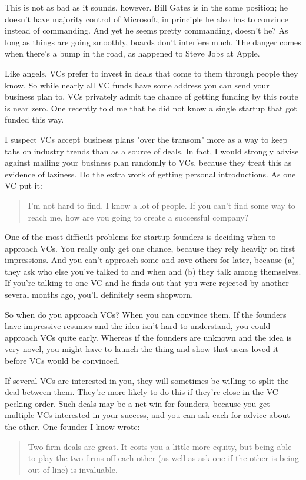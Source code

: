 This is not as bad as it sounds, however.  Bill Gates is in the
same position; he doesn't have majority control of Microsoft; in
principle he also has to convince instead of commanding.  And yet
he seems pretty commanding, doesn't he?  As long as things are going
smoothly, boards don't interfere much.  The danger comes when there's
a bump in the road, as happened to Steve Jobs at Apple.

Like angels, VCs prefer to invest in deals that come to them through
people they know.  So while nearly all VC funds have some address
you can send your business plan to, VCs privately admit the chance
of getting funding by this route is near zero.  One recently told
me that he did not know a single startup that got funded this way.

I suspect VCs accept business plans "over the transom" more as a
way to keep tabs on industry trends than as a source of deals.  In
fact, I would strongly advise against mailing your business plan
randomly to VCs, because they treat this as evidence of laziness.
Do the extra work of getting personal introductions.  As one VC put
it:
\begin{quote}

  I'm not hard to find.  I know a lot of people.  If you can't find
  some way to reach me, how are you going to create a successful
  company?

\end{quote}

One of the most difficult problems for startup founders is deciding
when to approach VCs. You really only get one chance, because they
rely heavily on first impressions.  And you can't approach some and
save others for later, because (a) they ask who else you've talked
to and when and (b) they talk among themselves.  If you're talking
to one VC and he finds out that you were rejected by another several
months ago, you'll definitely seem shopworn.

So when do you approach VCs?  When you can convince them.  If the
founders have impressive resumes and the idea isn't hard to understand,
you could approach VCs quite early.  Whereas if the founders are
unknown and the idea is very novel, you might have to launch the
thing and show that users loved it before VCs would be convinced.

If several VCs are interested in you, they will sometimes be willing
to split the deal between them.  They're more likely to do this if
they're close in the VC pecking order.  Such deals may be a net win
for founders, because you get multiple VCs interested in your
success, and you can ask each for advice about the other.  One
founder I know wrote:
\begin{quote}

  Two-firm deals are great. It costs you a little more equity, but
  being able to play the two firms off each other (as well as ask
  one if the other is being out of line) is invaluable.

\end{quote}

